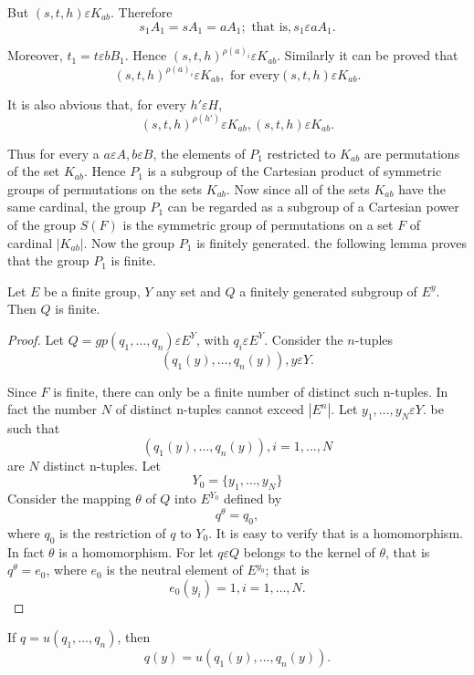 But $(s,t,h)\varepsilon K_{ab}$. Therefore
$$
s_1A_1=sA_1=aA_1; \text{ that is}, s_1 \varepsilon aA_1.
$$

Moreover, $t_1=t \varepsilon bB_1$. Hence
$(s,t,h)^{\rho(a)_i}\varepsilon K_{ab}$. Similarly it can be proved
that 
$$ 
(s,t,h)^{\rho(a)_i}\varepsilon K_{ab}, \text{ for every
}(s,t,h)\varepsilon K_{ab}. 
$$

It is also abvious that, for every $h' \varepsilon H$,
$$
(s,t,h)^{\rho(h')}\varepsilon K_{ab}, (s,t,h)\varepsilon K_{ab}.
$$

Thus for every a $a \varepsilon A,b \varepsilon B$, the elements of
$P_1$ restricted to $K_{ab}$ are permutations of the set
$K_{ab}$. Hence $P_1$ is a subgroup of the Cartesian product of
symmetric groups of permutations on the sets $K_{ab}$. Now since all
of the sets $K_{ab}$ have the same cardinal, the group $P_1$ can be
regarded as a subgroup of a Cartesian power of the group $S(F)$ is the
symmetric group of permutations on a set $F$ of cardinal
$|K_{ab}|$. Now the group $P_1$ is finitely generated. the following
lemma proves that the group $P_1$ is finite. 
\begin{lemma}
  Let $E$ be a finite group, $Y$ any set and $Q$ a finitely generated
  subgroup of $E^y$. Then $Q$ is finite. 
\end{lemma}

\begin{proof}
  Let $Q=gp(q_1, \ldots, q_n)\varepsilon E^Y$, with $q_i \varepsilon
  E^Y$. Consider the $n$-tuples 
  $$
  (q_1(y), \ldots, q_n(y)),y \varepsilon Y.
  $$

  Since $F$ is finite, there can only be a finite number of distinct
  such n-tuples. In fact the number $N$ of distinct n-tuples cannot
  exceed $|E^n|$. Let $y_1,\ldots, y_N \varepsilon Y$. be such that 
  $$
  (q_1(y), \ldots, q_n(y)),i=1,\ldots,N
  $$
  are $N$ distinct n-tuples. Let
  $$
  Y_0= \bigg \{ y_1,\ldots, y_N \bigg \}
  $$
  Consider the mapping $\theta$ of $Q$ into $E^{Y_0}$ defined by 
  $$
  q^\theta=q_0,
  $$
  where $q_0$ is the restriction of $q$ to $Y_0$. It is easy to verify
  that is a homomorphism. In fact $\theta$ is a homomorphism. For let
  $q \varepsilon Q$ belongs to the kernel of $\theta$, that is
  $q^\theta=e_0$, where $e_0$ is the neutral element of $E^{y_0}$;
  that is  
  $$
  e_0(y_i)=1, i=1, \ldots, N.
  $$
\end{proof}

If $q=u(q_1, \ldots, q_n)$, then
$$
q(y)=u(q_1(y), \ldots, q_n (y)).
$$

